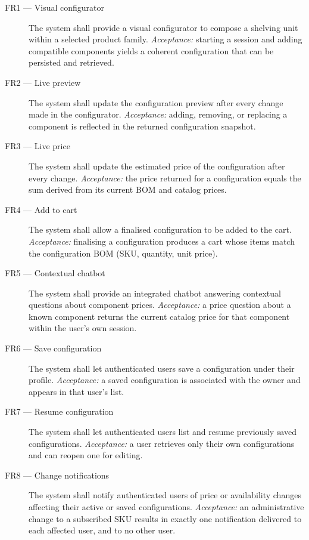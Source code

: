\begin{description}
  \item[FR1 --- Visual configurator] The system shall provide a visual
  configurator to compose a shelving unit within a selected product family.
  \emph{Acceptance:} starting a session and adding compatible components yields
  a coherent configuration that can be persisted and retrieved.

  \item[FR2 --- Live preview] The system shall update the configuration preview
  after every change made in the configurator. \emph{Acceptance:} adding,
  removing, or replacing a component is reflected in the returned configuration
  snapshot.

  \item[FR3 --- Live price] The system shall update the estimated price of the
  configuration after every change. \emph{Acceptance:} the price returned for a
  configuration equals the sum derived from its current BOM and catalog prices.

  \item[FR4 --- Add to cart] The system shall allow a finalised configuration to
  be added to the cart. \emph{Acceptance:} finalising a configuration produces a
  cart whose items match the configuration BOM (SKU, quantity, unit price).

  \item[FR5 --- Contextual chatbot] The system shall provide an integrated
  chatbot answering contextual questions about component prices.
  \emph{Acceptance:} a price question about a known component returns the
  current catalog price for that component within the user's own session.

  \item[FR6 --- Save configuration] The system shall let authenticated users
  save a configuration under their profile. \emph{Acceptance:} a saved
  configuration is associated with the owner and appears in that user's list.

  \item[FR7 --- Resume configuration] The system shall let authenticated users
  list and resume previously saved configurations. \emph{Acceptance:} a user
  retrieves only their own configurations and can reopen one for editing.

  \item[FR8 --- Change notifications] The system shall notify authenticated
  users of price or availability changes affecting their active or saved
  configurations. \emph{Acceptance:} an administrative change to a subscribed
  SKU results in exactly one notification delivered to each affected user, and
  to no other user.


\end{description}
